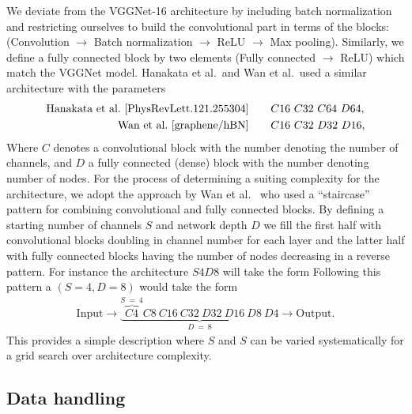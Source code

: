 We deviate from the VGGNet-16 architecture by including batch normalization and restricting ourselves to build the convolutional part in terms of the blocks: (Convolution $\to$ Batch normalization $\to$ ReLU $\to$ Max pooling). Similarly, we define a fully connected block by two elements (Fully connected $\to$ ReLU) which match the VGGNet model. Hanakata et al.\ and Wan et al.\ used a similar architecture with the parameters 
\begin{align*}
  \text{Hanakata et al.\ \cite{PhysRevLett.121.255304}} & \qquad C16 \ C32 \ C64 \ D64, \\ 
  \text{Wan et al.\ \cite{graphene/hBN}} & \qquad C16 \ C32 \ D32 \ D16,
\end{align*}
Where $C$ denotes a convolutional block with the number denoting the number of channels, and $D$ a fully connected (dense) block with the number denoting number of nodes. For the process of determining a suiting complexity for the architecture, we adopt the approach by Wan et al.\ \cite{graphene/hBN} who used a ``staircase'' pattern for combining convolutional and fully connected blocks. By defining a starting number of channels $S$ and network depth $D$ we fill the first half with convolutional blocks doubling in channel number for each layer and the latter half with fully connected blocks having the number of nodes decreasing in a reverse pattern. For instance the architecture $S4D8$ will take the form
Following this pattern a $(S=4, D=8)$ would take the form
\begin{align*}
  \text{Input} \to \underbrace{\overbrace{C4}^{S \ = \ 4}C8 \ C16 \ C32 \ D32 \ D16 \ D8 \ D4}_{D \ = \ 8} \to \text{Output}.
\end{align*} 
This provides a simple description where $S$ and $S$  can be varied systematically for a grid search over architecture complexity. 


\subsection{Data handling}

